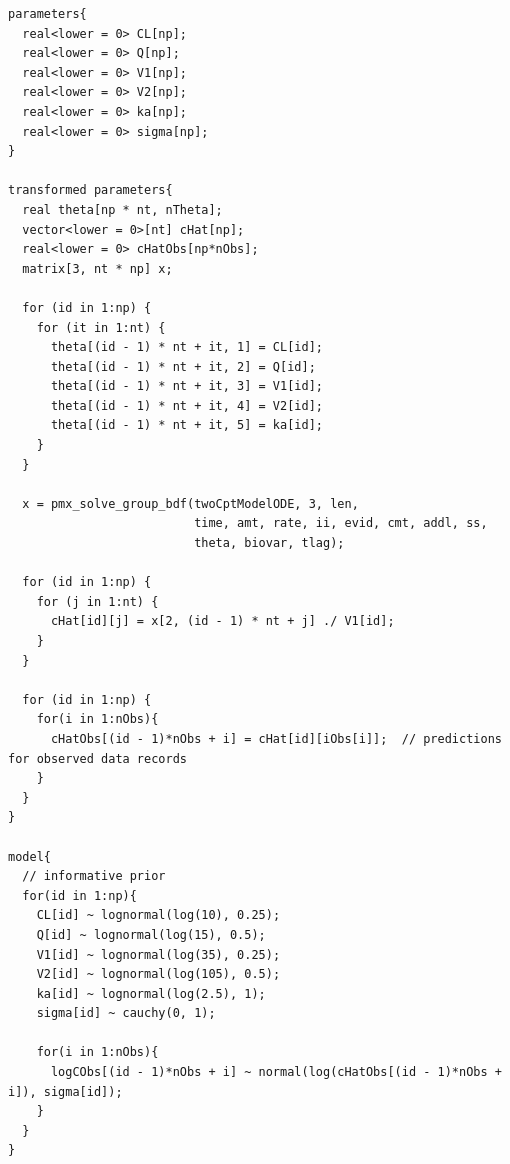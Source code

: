 \documentclass[11pt, reqno, oneside]{amsbook}
\numberwithin{equation}{chapter}
\numberwithin{figure}{chapter}
\numberwithin{table}{chapter}
\theoremstyle{remark}
\begin{document}
\begin{verbatim}
parameters{
  real<lower = 0> CL[np];
  real<lower = 0> Q[np];
  real<lower = 0> V1[np];
  real<lower = 0> V2[np];
  real<lower = 0> ka[np];
  real<lower = 0> sigma[np];
}

transformed parameters{
  real theta[np * nt, nTheta];
  vector<lower = 0>[nt] cHat[np];
  real<lower = 0> cHatObs[np*nObs];
  matrix[3, nt * np] x; 

  for (id in 1:np) {
    for (it in 1:nt) {
      theta[(id - 1) * nt + it, 1] = CL[id];
      theta[(id - 1) * nt + it, 2] = Q[id];
      theta[(id - 1) * nt + it, 3] = V1[id];
      theta[(id - 1) * nt + it, 4] = V2[id];
      theta[(id - 1) * nt + it, 5] = ka[id];
    }
  }

  x = pmx_solve_group_bdf(twoCptModelODE, 3, len,
                          time, amt, rate, ii, evid, cmt, addl, ss,
                          theta, biovar, tlag);

  for (id in 1:np) {
    for (j in 1:nt) {
      cHat[id][j] = x[2, (id - 1) * nt + j] ./ V1[id];
    }
  }

  for (id in 1:np) {
    for(i in 1:nObs){
      cHatObs[(id - 1)*nObs + i] = cHat[id][iObs[i]];  // predictions for observed data records
    }
  }
}

model{
  // informative prior
  for(id in 1:np){
    CL[id] ~ lognormal(log(10), 0.25);
    Q[id] ~ lognormal(log(15), 0.5);
    V1[id] ~ lognormal(log(35), 0.25);
    V2[id] ~ lognormal(log(105), 0.5);
    ka[id] ~ lognormal(log(2.5), 1);
    sigma[id] ~ cauchy(0, 1);

    for(i in 1:nObs){
      logCObs[(id - 1)*nObs + i] ~ normal(log(cHatObs[(id - 1)*nObs + i]), sigma[id]);
    }
  }
}
\end{verbatim}
\end{document}
